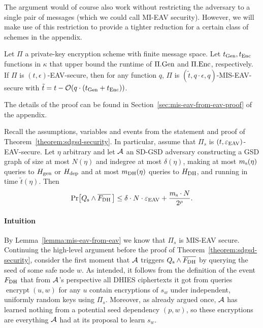 The argument would of course also work without restricting the adversary to a single pair of messages (which we could call MI-EAV security). However, we will make use of this restriction to provide a tighter reduction for a certain class of schemes in the appendix.

\begin{lemma} \label{lemma:mis-eav-from-eav}
	Let $\Pi$ a private-key encryption scheme with finite message space. Let $t_{\mathrm{Gen}}, t_{\mathrm{Enc}}$ functions in $\kappa$ that upper bound the runtime of $\Pi.\mathrm{Gen}$ and $\Pi.\mathrm{Enc}$, respectively. If $\Pi$ is $(t, \epsilon)$-EAV-secure, then for any function $q$, $\Pi$ is $(\tilde{t}, q \cdot \epsilon, q)$-MIS-EAV-secure with $\tilde{t} = t - \mathcal{O}(q \cdot (t_{\mathrm{Gen}} + t_{\mathrm{Enc}}))$.
\end{lemma}

The details of the proof can be found in Section~\ref{sec:mis-eav-from-eav-proof} of the appendix.

\begin{lemma} \label{lemma:eav-reduction}
	Recall the assumptions, variables and events from the statement and proof of Theorem~\ref{theorem:sdgsd-security}. In particular, assume that $\Pi_s$ is $(t, \varepsilon_\mathrm{EAV})$-EAV-secure. Let $\eta$ arbitrary and let $\mathcal{A}$ an SD-GSD adversary constructing a GSD graph of size at most $N(\eta)$ and indegree at most $\delta(\eta)$, making at most $m_\mathrm{s}(\eta)$ queries to $H_\mathrm{gen}$ or $H_\mathrm{dep}$ and at most $m_\mathrm{DH}(\eta)$ queries to $H_\mathrm{DH}$, and running in time $\tilde{t}(\eta)$. Then
	\[
		\pr{\qs \land \overline{\fdh}\,} \le \delta \cdot N \cdot \eeav + \frac{\ms \cdot N}{2^\rho}.
	\]
\end{lemma}

\paragraph{Intuition} By Lemma~\ref{lemma:mis-eav-from-eav} we know that $\Pi_s$ is MIS-EAV secure. Continuing the high-level argument before the proof of Theorem~\ref{theorem:sdgsd-security}, consider the first moment that $\mathcal{A}$ triggers $Q_\mathrm{s} \land \overline{F_\mathrm{DH}}$ by querying the seed of some safe node $w$.  As intended, it follows from the definition of the event $F_\mathrm{DH}$ that from $\mathcal{A}$'s perspective all DHIES ciphertexts it got from queries $\operatorname{encrypt}(u, w)$ for any $u$ contain encryptions of $s_w$ under independent, uniformly random keys using $\Pi_s$. Moreover, as already argued once, $\mathcal{A}$ has learned nothing from a potential seed dependency $(p, w)$, so these encryptions are everything $\mathcal{A}$ had at its proposal to learn $s_w$.

